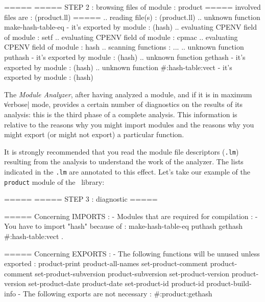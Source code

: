 \begin{Longcode*}
=====
===== STEP 2 : browsing files of module : product
=====          involved files are : (product.ll)
=====
.. reading file(s) : (product.ll)
.. unknown function make-hash-table-eq - it's exported by module : (hash)
.. evaluating CPENV field of module : setf
.. evaluating CPENV field of module : cpmac
.. evaluating CPENV field of module : hash
.. scanning functions : ...
.. unknown function puthash - it's exported by module : (hash)
.. unknown function gethash - it's exported by module : (hash)
.. unknown function #:hash-table:vect - it's exported by module : (hash)

\end{Longcode*}


The {\em Module Analyzer}, after having analyzed a module, and if it is in maximum \|verbose| mode, provides a certain number of diagnostics on the results of its analysis:  this is the third phase of a complete analysis.  This information is relative to the reasons why you might import modules and the reasons why you might export (or might not export) a particular function.

It is strongly recommended that you read the module file descriptors ({\tt .lm}) resulting from the analysis to understand the work of the analyzer.  The lists indicated in the {\tt .lm} are annotated to this effect. 
Let's take our example of the {\tt product} module of the \LeLisp\ library:
\begin{Longcode*}
=====
===== STEP 3 : diagnostic
=====

===== Concerning IMPORTS :
- Modules that are required for compilation :
- You have to import "hash" because of :
 make-hash-table-eq puthash gethash #:hash-table:vect .

===== Concerning EXPORTS :
- The following functions will be unused unless exported :
     product-print
     product-all-names
     set-product-comment
     product-comment
     set-product-subversion
     product-subversion
     set-product-version
     product-version
     set-product-date
     product-date
     set-product-id
     product-id
     product-build-info
- The following exports are not necessary :
     #:product:gethash

\end{Longcode*}

